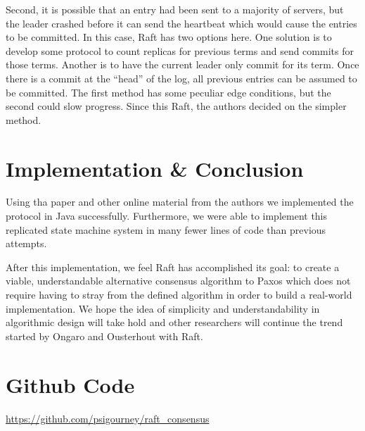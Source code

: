 Second, it is possible that an entry had been sent to a majority of servers, but the leader crashed before it can send the heartbeat which would cause the entries to be committed.
In this case, Raft has two options here.
One solution is to develop some protocol to count replicas for previous terms and send commits for those terms.
Another is to have the current leader only commit for its term.
Once there is a commit at the ``head'' of the log, all previous entries can be assumed to be committed.
The first method has some peculiar edge conditions, but the second could slow progress.
Since this Raft, the authors decided on the simpler method.


\section{Implementation \& Conclusion}
Using tha paper and other online material from the authors we implemented the protocol in Java successfully.
Furthermore, we were able to implement this replicated state machine system in many fewer lines of code than previous attempts.

After this implementation, we feel Raft has accomplished its goal: to create a viable, understandable alternative consensus algorithm to Paxos which does not require having to stray from the defined algorithm in order to build a real-world implementation.  We hope the idea of simplicity and understandability in algorithmic design will take hold and other researchers will continue the trend started by Ongaro and Ousterhout with Raft.



\newpage







\appendix

\section{Github Code}

\href{https://github.com/psigourney/raft_consensus}{https://github.com/psigourney/raft\_consensus}

%

